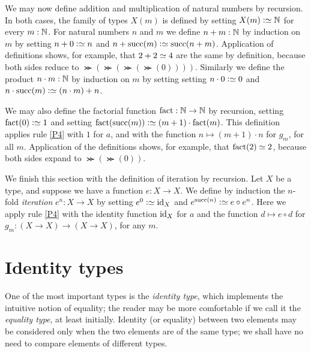 We may now define addition and multiplication of natural numbers by recursion.  In both cases, the family of types $X(m)$ is defined by setting
$X(m) \defeq \NN$ for every $m : \mathbb{N}$.  For natural numbers $n$ and $m$ we define $n+m : \mathbb{N}$ by induction on $m$ by setting $n+0\defeq n$ and
$n+\Succ(m)\defeq \Succ(n+m)$.  Application of definitions shows, for example, that $2+2 \jdeq 4$ are the same by definition, because both sides reduce
to $\Succ(\Succ(\Succ(\Succ(0))))$.  Similarly we define the product $n \cdot m : \mathbb{N}$ by induction on $m$ by setting setting $n\cdot 0\defeq 0$ and $n\cdot
\Succ(m)\defeq (n\cdot m) + n$.

We may also define the factorial function $\fact : \NN \to \NN$ by recursion, setting $\fact(0) \defeq 1$ and setting
$\fact(\Succ(m)) \defeq (m+1) \cdot \fact(m)$.  This definition applies rule \ref{P4} with $1$ for $a$, and with the
function $n \mapsto (m+1) \cdot n$ for $g_m$, for all $m$.
Application of the definitions shows, for example, that $\fact(2) \jdeq 2$, because both sides expand to $\Succ(\Succ(0))$.

We finish this section with the definition of iteration by recursion.  Let $X$ be a type, and suppose we have a function $e : X \to X$.  We
define by induction the $n$-fold \emph{iteration} $e^n : X \to X$ by setting $e^0 \defeq \id_X$ and $e^{\Succ(n)}\defeq e\circ e^n$.%
Here we apply rule \ref{P4} with the identity function $\mathord{\mathrm{id}}_X$ for $a$
and the function $d \mapsto e\circ d$ for $g_m : (X\to X)\to(X\to X)$, for any $m$.

\section{Identity types}
\label{sec:identity-types}

One of the most important types is the \emph{identity type}, which implements the intuitive notion of equality; the reader may be more
comfortable if we call it the \emph{equality type},%
at least initially.  Identity (or equality) between two elements may be considered only when
the two elements are of the same type; we shall have no need to compare elements of different types.

